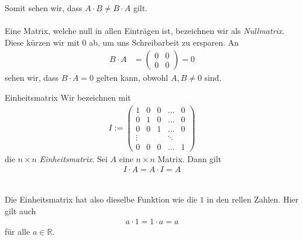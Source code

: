 Somit sehen wir, dass $A \cdot B \neq B \cdot A $ gilt.\\
\\
Eine Matrix, welche null in allen Einträgen ist, bezeichnen wir als \textit{Nullmatrix}.
Diese kürzen wir mit $0$ ab, um uns Schreibarbeit zu ersparen.
An
\begin{align*}
B \cdot A
&= 
\begin{pmatrix}
0 & 0 \\
0 & 0
\end{pmatrix}
=0
\end{align*}
sehen wir, dass $B \cdot A = 0$ gelten kann, obwohl $A, B \neq 0$ sind.\\

\begin{mybox}{Einheitsmatrix}
Wir bezeichnen mit
\begin{align*}
I := 
\begin{pmatrix}
1 & 0 & 0 & \dots & 0 \\
0 & 1 & 0 & \dots & 0 \\
0 & 0 & 1 & \dots & 0\\
\vdots &  &  & \ddots & \\
0 & 0 & 0 & \dots & 1 
\end{pmatrix}
\end{align*}
die $n \times n$ \textit{Einheitsmatrix}.
Sei $A$ eine $n \times n$ Matrix.
Dann gilt
\begin{align*}
I \cdot A = A \cdot I = A
\end{align*}
\end{mybox}\ \\
Die Einheitsmatrix hat also dieselbe Funktion wie die $1$ in den rellen Zahlen.
Hier gilt auch
\begin{align*}
a \cdot 1 = 1 \cdot a = a
\end{align*}
für alle $a \in \mathbb{R}$.

\newpage
